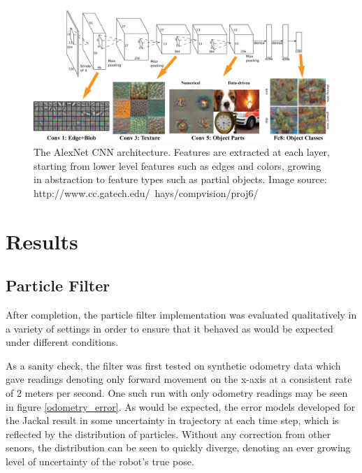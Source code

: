 \documentclass[letterpaper, 12 pt, conference]{ieeeconf}  %
\begin{document}
\begin{figure}[h]
\centering
\includegraphics[scale=0.4]{alexnet}
\caption{The AlexNet CNN architecture. Features are extracted at each layer, starting from lower level features such as edges and colors, growing in abstraction to feature types such as partial objects. Image source: http://www.cc.gatech.edu/~hays/compvision/proj6/}
\end{figure}



\section{Results}

\subsection{Particle Filter}

After completion, the particle filter implementation was evaluated qualitatively in a variety of settings in order to ensure that it behaved as would be expected under different conditions. 
\par
As a sanity check, the filter was first tested on synthetic odometry data which gave readings denoting only forward movement on the x-axis at a consistent rate of 2 meters per second. One such run with only odometry readings may be seen in figure \ref{odometry_error}. As would be expected, the error models developed for the Jackal result in some uncertainty in trajectory at each time step, which is reflected by the distribution of particles. Without any correction from other senors, the distribution can be seen to quickly diverge, denoting an ever growing level of uncertainty of the robot's true pose. 
\end{document}
